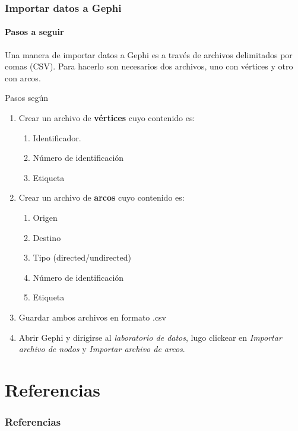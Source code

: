 \documentclass[10pt,handout]{beamer}
\begin{document}
\begin{frame}
\frametitle{Importar datos a Gephi}
\framesubtitle{Pasos a seguir}

Una manera de importar datos a Gephi es a trav\'es de archivos delimitados por
comas (CSV). Para hacerlo son necesarios dos archivos, uno con v\'ertices y otro
con arcos.

Pasos seg\'un \cite{cherven2013network}

\begin{enumerate}
\item Crear un archivo de {\bf v\'ertices} cuyo contenido es:
  \begin{enumerate}
  \item Identificador.
  \item N\'umero de identificaci\'on
  \item Etiqueta
  \end{enumerate}
\item Crear un archivo de {\bf arcos} cuyo contenido es:
  \begin{enumerate}
  \item Origen
  \item Destino
  \item Tipo (directed/undirected)
  \item N\'umero de identificaci\'on
  \item Etiqueta
  \end{enumerate}
\item Guardar ambos archivos en formato .csv
\item Abrir Gephi y dirigirse al \emph{laboratorio de datos}, lugo clickear en
\emph{Importar archivo de nodos} y \emph{Importar archivo de arcos}.
\end{enumerate}
\end{frame}

\section{Referencias}
\begin{frame}[allowframebreaks]
\footnotesize
\frametitle{Referencias}


\end{frame}
\end{document}

